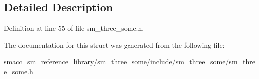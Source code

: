 \subsection{Detailed Description}


Definition at line 55 of file sm\+\_\+three\+\_\+some.\+h.



The documentation for this struct was generated from the following file\+:\begin{DoxyCompactItemize}
\item 
smacc\+\_\+sm\+\_\+reference\+\_\+library/sm\+\_\+three\+\_\+some/include/sm\+\_\+three\+\_\+some/\hyperlink{sm__three__some_8h}{sm\+\_\+three\+\_\+some.\+h}\end{DoxyCompactItemize}

